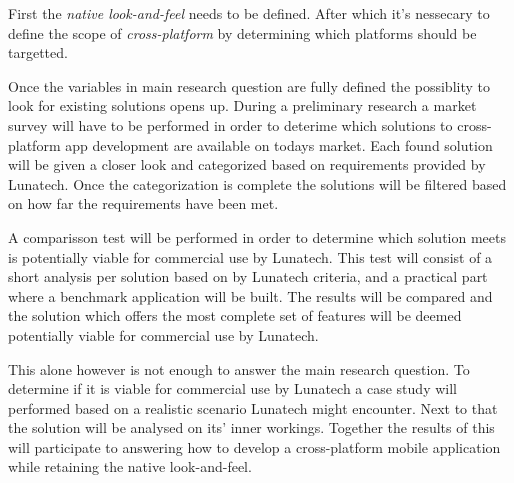 
First the \emph{native look-and-feel} needs to be defined. After which it's nessecary to define the scope of \emph{cross-platform} by determining which platforms should be targetted.

Once the variables in main research question are fully defined the possiblity to look for existing solutions opens up. During a preliminary research a market survey will have to be performed in order to deterime which solutions to cross-platform app development are available on todays market. Each found solution will be given a closer look and categorized based on requirements provided by Lunatech. Once the categorization is complete the solutions will be filtered based on how far the requirements have been met.

A comparisson test will be performed in order to determine which solution meets is potentially viable for commercial use by Lunatech. This test will consist of a short analysis per solution based on by Lunatech criteria, and a practical part where a benchmark application will be built. The results will be compared and the solution which offers the most complete set of features will be deemed potentially viable for commercial use by Lunatech.

This alone however is not enough to answer the main research question. To determine if it is viable for commercial use by Lunatech a case study will performed based on a realistic scenario Lunatech might encounter. Next to that the solution will be analysed on its' inner workings. Together the results of this will participate to answering how to develop a cross-platform mobile application while retaining the native look-and-feel.

